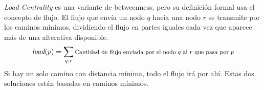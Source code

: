 \documentclass[a4paper,11pt]{book}
\theoremstyle{definition}
\begin{document}
\emph{Load Centrality} es una variante de betweenness, pero su definición formal usa el concepto de flujo.
%
El flujo que envía un nodo $q$ hacia una nodo $r$ se transmite por los caminos mínimos, dividiendo el flujo en partes iguales cada vez que aparece más de una alterativa disponible.
%
\begin{equation}
	\emph{load}(p)= {\footnotesize \sum_{q,r} \text{Cantidad de flujo enviada por el nodo $q$ al $r$ que pasa por $p$} }
\end{equation}
%
Si hay un solo camino con distancia mínima, todo el flujo irá por ahí.
%
Estas dos soluciones están basadas en caminos mínimos.
%
%
%
%
%
%
%
\end{document}

